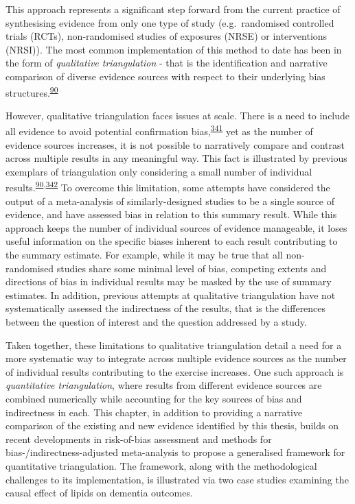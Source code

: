 \documentclass[a4paper, twoside]{templates/ociamthesis}
\begin{document}
This approach represents a significant step forward from the current practice of synthesising evidence from only one type of study (e.g.~randomised controlled trials (RCTs), non-randomised studies of exposures (NRSE) or interventions (NRSI)). The most common implementation of this method to date has been in the form of \emph{qualitative triangulation} - that is the identification and narrative comparison of diverse evidence sources with respect to their underlying bias structures.\textsuperscript{\protect\hyperlink{ref-lawlor2016}{90}}

However, qualitative triangulation faces issues at scale. There is a need to include all evidence to avoid potential confirmation bias,\textsuperscript{\protect\hyperlink{ref-dubroff2018}{341}} yet as the number of evidence sources increases, it is not possible to narratively compare and contrast across multiple results in any meaningful way. This fact is illustrated by previous exemplars of triangulation only considering a small number of individual results.\textsuperscript{\protect\hyperlink{ref-lawlor2016}{90},\protect\hyperlink{ref-ference2014}{342}} To overcome this limitation, some attempts have considered the output of a meta-analysis of similarly-designed studies to be a single source of evidence, and have assessed bias in relation to this summary result. While this approach keeps the number of individual sources of evidence manageable, it loses useful information on the specific biases inherent to each result contributing to the summary estimate. For example, while it may be true that all non-randomised studies share some minimal level of bias, competing extents and directions of bias in individual results may be masked by the use of summary estimates. In addition, previous attempts at qualitative triangulation have not systematically assessed the indirectness of the results, that is the differences between the question of interest and the question addressed by a study.

Taken together, these limitations to qualitative triangulation detail a need for a more systematic way to integrate across multiple evidence sources as the number of individual results contributing to the exercise increases. One such approach is \emph{quantitative triangulation}, where results from different evidence sources are combined numerically while accounting for the key sources of bias and indirectness in each. This chapter, in addition to providing a narrative comparison of the existing and new evidence identified by this thesis, builds on recent developments in risk-of-bias assessment and methods for bias-/indirectness-adjusted meta-analysis to propose a generalised framework for quantitative triangulation. The framework, along with the methodological challenges to its implementation, is illustrated via two case studies examining the causal effect of lipids on dementia outcomes.
\end{document}
